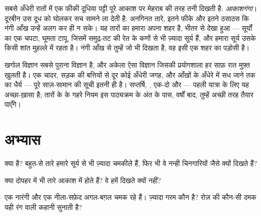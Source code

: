 \begin{example}[तारों का हमारा शहर]\label{ex:g5:stars-night-sky:milkyway}
सबसे अँधेरी रातों में एक फीकी दूधिया पट्टी पूरे आकाश पर मेहराब की तरह
तनी दिखती है: \emph{आकाशगंगा}। दूरबीन उस दूध को घोलकर
सच सामने ला देती है: अनगिनत तारे, इतने फीके और इतने ठसाठस कि नंगी आँख
उन्हें अलग कर ही न सके। यह तारों का हमारा अपना शहर है, भीतर से देखा
हुआ --- सूर्यों का एक चपटा, घूमता टापू, जिसमें समुद्र-तट की रेत के
कणों से भी ज़्यादा सूर्य हैं, और हमारा सूर्य उसके किसी शांत मुहल्ले
में रहता है। नंगी आँख से तुम्हें जो भी  दिखता है, वह इसी एक शहर
का पड़ोसी है।
\end{example}

\begin{remark}[ऊपर देखते रहो]\label{rem:g5:stars-night-sky:lookup}
खगोल विज्ञान सबसे पुराना विज्ञान है, और अकेला ऐसा विज्ञान जिसकी
प्रयोगशाला हर साफ़ रात मुफ़्त खुलती है। एक चादर, सड़क की बत्तियों से
दूर कोई अँधेरी जगह, और आँखों के अँधेरे में सध जाने तक का धैर्य ---
पूरे साज़-सामान की सूची इतनी ही है। सप्तर्षि, , एक-दो 
और  --- पहली यात्रा के लिए यह अच्छा-ख़ासा है; तारों के 
के गहरे नियम इस पाठ्यक्रम के अंत के पास, वर्षों बाद, तुम्हें अच्छी
तरह तैयार पाएँगे।
\end{remark}

\section{अभ्यास}

\begin{exercise}[$\star$]\label{exo:g5:stars-night-sky:1}
 क्या है? बहुत-से तारे हमारे सूर्य से भी ज़्यादा चमकीले हैं, फिर
भी वे नन्ही चिनगारियों जैसे क्यों दिखते हैं?
\end{exercise}

\begin{exercise}[$\star$]\label{exo:g5:stars-night-sky:2}
क्या दोपहर में भी तारे आकाश में होते हैं? वे हमें दिखते क्यों नहीं?
\end{exercise}

\begin{exercise}[$\star$]\label{exo:g5:stars-night-sky:3}
एक नारंगी  और एक नीला-सफ़ेद  अगल-बग़ल चमक रहे हैं। ज़्यादा
गरम कौन है? रोज़ की कौन-सी दमक यही रंग वाली कहानी सुनाती है?
\end{exercise}

